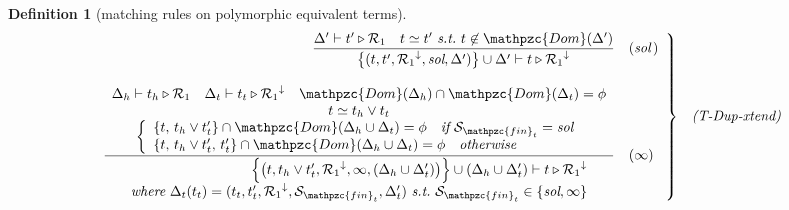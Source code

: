 \documentclass[12pt]{article}
\newtheorem{Definition}{Definition}[section]
\begin{document}
\begin{Definition}[matching rules on polymorphic equivalent terms]
\begin{displaymath}
\begin{array}{c}
      \begin{array}{rl}
        \left. \begin{array}{rl}
          \dfrac{
            \Delta' \vdash t' \triangleright \mathcal{R}_1 \quad
             t \simeq t'\ \text{\it s.t.}\ t \not\in \mathpzc{Dom}(\Delta')
          }{
            \bigl\{(t, t', {\mathcal{R}_1}^\downarrow, \text{\it sol},
             \Delta') \bigr\} \cup \Delta' \vdash
              t \triangleright {\mathcal{R}_1}^\downarrow
          }  &  (\text{\it sol}\,)  \\
          \\
          
          \dfrac{
            \begin{array}{c}
              \Delta_h \vdash t_h \triangleright \mathcal{R}_1
               \quad \Delta_t \vdash t_t \triangleright
                {\mathcal{R}_1}^\downarrow
                 \quad \mathpzc{Dom}(\Delta_h) \cap \mathpzc{Dom}(\Delta_t)
                  = \phi  \\
              t \simeq t_h \vee t_t  \\
              \left\{\begin{array}{l}
                \{t,\, t_h \vee t'_t \} \cap \mathpzc{Dom}(
                 \Delta_h \cup \Delta_t) = \phi\quad \text{\it if}\
                  \mathcal{S}_{\mathpzc{fin}_t} = \text{\it sol}  \\
                \{t,\, t_h \vee t'_t,\, t'_t \} \cap \mathpzc{Dom}(
                 \Delta_h \cup \Delta_t) = \phi\quad \text{\it otherwise}
              \end{array}\right.
            \end{array}
          }{
            \begin{array}{r}
              \Bigl\{\bigl(t, t_h \vee t_t', {\mathcal{R}_1}^\downarrow,
               \infty, (\Delta_h \cup \Delta_t') \bigr) \Bigr\} \cup
                (\Delta_h \cup \Delta_t') \vdash
                 t \triangleright {\mathcal{R}_1}^\downarrow  \\
              \text{\it where}\
               \Delta_t(t_t) = (t_t, t_t', {\mathcal{R}_1}^\downarrow,
                \mathcal{S}_{\mathpzc{fin}_t}, \Delta_t')\ \text{\it s.t.}\
                 \mathcal{S}_{\mathpzc{fin}_t} \in \{\text{\it sol}, \infty\}
            \end{array}
          }  &  (\infty)
        \end{array} \right\}  &  \text{\it (T-Dup-xtend)}
      \end{array}
      

\end{array}
\end{displaymath}
\end{Definition}
\end{document}
